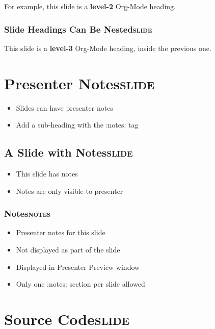 \documentclass[11pt]{article}
\begin{document}
For example, this slide is a \textbf{level-2} Org-Mode heading.

\subsubsection{Slide Headings Can Be Nested\hfill{}\textsc{slide}}
\label{sec:orgheadline57}

This slide is a \textbf{level-3} Org-Mode heading, inside the previous one.

\section{Presenter Notes\hfill{}\textsc{slide}}
\label{sec:orgheadline62}

\begin{itemize}
\item Slides can have presenter notes
\item Add a sub-heading with the :notes: tag
\end{itemize}

\subsection{A Slide with Notes\hfill{}\textsc{slide}}
\label{sec:orgheadline61}

\begin{itemize}
\item This slide has notes
\item Notes are only visible to presenter
\end{itemize}

\subsubsection{Notes\hfill{}\textsc{notes}}
\label{sec:orgheadline60}

\begin{itemize}
\item Presenter notes for this slide
\item Not displayed as part of the slide
\item Displayed in Presenter Preview window
\item Only one :notes: section per slide allowed
\end{itemize}

\section{Source Code\hfill{}\textsc{slide}}
\label{sec:orgheadline65}
\end{document}
